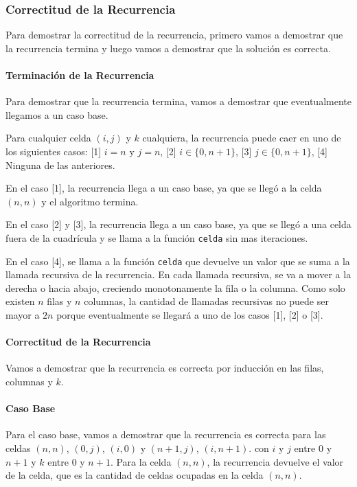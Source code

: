\subsubsection{Correctitud de la Recurrencia}

Para demostrar la correctitud de la recurrencia, primero vamos a demostrar que la recurrencia
termina y luego vamos a demostrar que la solución es correcta.

\paragraph{Terminación de la Recurrencia}

Para demostrar que la recurrencia termina, vamos a demostrar que eventualmente llegamos a un caso base.

Para cualquier celda $(i, j)$ y $k$ cualquiera, la recurrencia puede caer en uno de los siguientes casos:
[1] $i = n$ y $j = n$,
[2] $i \in \{0, n+1\}$,
[3] $j \in \{0, n+1\}$,
[4] Ninguna de las anteriores.

En el caso [1], la recurrencia llega a un caso base, ya que se llegó a la celda $(n, n)$ y el algoritmo termina.

En el caso [2] y [3], la recurrencia llega a un caso base, ya que se llegó a una celda fuera de la cuadrícula y 
se llama a la función \texttt{celda} sin mas iteraciones.

En el caso [4], se llama a la función \texttt{celda} que devuelve un valor que se suma a la llamada recursiva
de la recurrencia. En cada llamada recursiva, se va a mover a la derecha o hacia abajo, creciendo monotonamente
la fila o la columna. Como solo existen $n$ filas y $n$ columnas, la cantidad de llamadas recursivas no puede ser
mayor a $2n$ porque eventualmente se llegará a uno de los casos [1], [2] o [3].

\paragraph{Correctitud de la Recurrencia}
Vamos a demostrar que la recurrencia es correcta por inducción en las filas, columnas y $k$.

\paragraph{Caso Base} 
Para el caso base, vamos a demostrar que la recurrencia es correcta para las celdas $(n, n)$, $(0, j)$, $(i, 0)$ y $(n+1, j)$, $(i, n+1)$.
con $i$ y $j$ entre $0$ y $n+1$ y $k$ entre $0$ y $n+1$.
Para la celda $(n, n)$, la recurrencia devuelve el valor de la celda, que es la cantidad de celdas ocupadas en la celda $(n, n)$.
